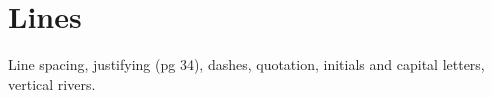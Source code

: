 \section{Lines} 

  Line spacing, justifying (pg 34), dashes, quotation, initials and capital letters, vertical rivers. 


